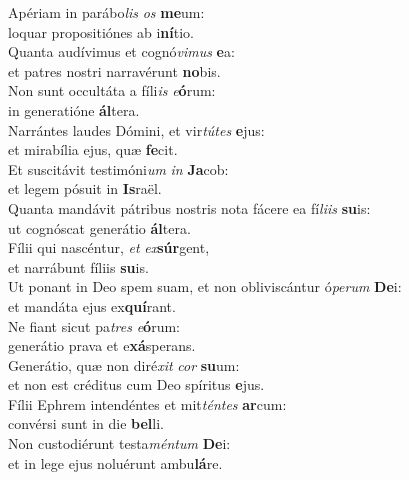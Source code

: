 \evenverse Apériam in parábo\textit{lis} \textit{os} \textbf{me}um:~\*\\
\evenverse loquar propositiónes ab i\textbf{ní}tio.\\
\oddverse Quanta audívimus et cognó\textit{vi}\textit{mus} \textbf{e}a:~\*\\
\oddverse et patres nostri narravérunt \textbf{no}bis.\\
\evenverse Non sunt occultáta a fíli\textit{is} \textit{e}\textbf{ó}rum:~\*\\
\evenverse in generatióne \textbf{ál}tera.\\
\oddverse Narrántes laudes Dómini, et vir\textit{tú}\textit{tes} \textbf{e}jus:~\*\\
\oddverse et mirabília ejus, quæ \textbf{fe}cit.\\
\evenverse Et suscitávit testimóni\textit{um} \textit{in} \textbf{Ja}cob:~\*\\
\evenverse et legem pósuit in \textbf{Is}raël.\\
\oddverse Quanta mandávit pátribus nostris nota fácere ea fí\textit{li}\textit{is} \textbf{su}is:~\*\\
\oddverse ut cognóscat generátio \textbf{ál}tera.\\
\evenverse Fílii qui nascéntur, \textit{et} \textit{ex}\textbf{súr}gent,~\*\\
\evenverse et narrábunt fíliis \textbf{su}is.\\
\oddverse Ut ponant in Deo spem suam, et non obliviscántur ó\textit{pe}\textit{rum} \textbf{De}i:~\*\\
\oddverse et mandáta ejus ex\textbf{quí}rant.\\
\evenverse Ne fiant sicut pa\textit{tres} \textit{e}\textbf{ó}rum:~\*\\
\evenverse generátio prava et e\textbf{xá}sperans.\\
\oddverse Generátio, quæ non diré\textit{xit} \textit{cor} \textbf{su}um:~\*\\
\oddverse et non est créditus cum Deo spíritus \textbf{e}jus.\\
\evenverse Fílii Ephrem intendéntes et mit\textit{tén}\textit{tes} \textbf{ar}cum:~\*\\
\evenverse convérsi sunt in die \textbf{bel}li.\\
\oddverse Non custodiérunt testa\textit{mén}\textit{tum} \textbf{De}i:~\*\\
\oddverse et in lege ejus noluérunt ambu\textbf{lá}re.\\
